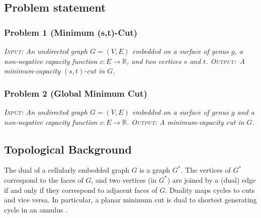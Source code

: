 \documentclass[natbib]{svcyclop}
\begin{document}
\subsection{Problem statement}

\subsubsection{Problem 1 (Minimum (s,t)-Cut)}
{\itshape
\textsc{Input}: An undirected graph $G = (V, E)$ embedded on a surface of genus $g$, a non-negative capacity function $c\colon E \to \mathbb{R}$, and two vertices $s$ and $t$. \textsc{Output}:~A minimum-capacity $(s,t)$-cut in $G$.}


\subsubsection{Problem 2 (Global Minimum Cut)}
{\itshape
\textsc{Input}: An undirected graph $G = (V, E)$  embedded on a surface of genus $g$ and a non-negative capacity function $c\colon E \to \mathbb{R}$.  \textsc{Output}: A minimum-capacity cut in $G$.}




\KeyRes

\subsection{Topological Background}


The dual of a cellularly embedded graph $G$ is a graph $G^*$.  The vertices of $G^*$ correspond to the faces of $G$, and two vertices (in $G^*$) are joined by a (dual) edge if and only if they correspond to adjacent faces of $G$.
Duality maps cycles to cuts and vice versa.  
In particular, a planar minimum cut is dual to shortest generating cycle in an annulus \cite{is-mfpn-79, r-mstcp-83}.
\end{document}
